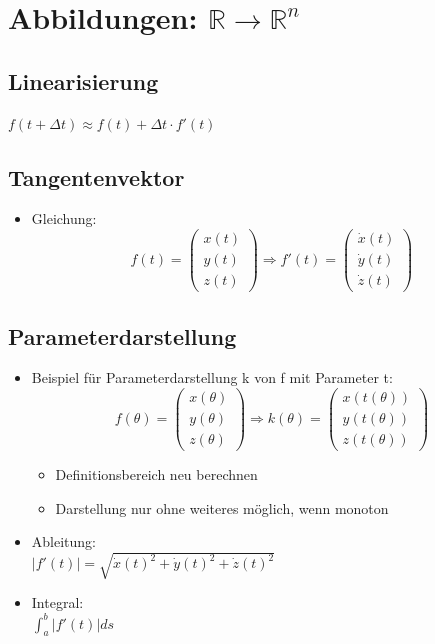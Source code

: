 \section{Abbildungen: $\mathbb{R} \rightarrow \mathbb{R}^n$}

\subsection{Linearisierung}
$f(t+\Delta t) \approx f(t) + \Delta t \cdot f'(t)$

\subsection{Tangentenvektor}
\begin{itemize}
	\item Gleichung: \\
	\begin{displaymath}
		f(t) =
		\begin{pmatrix}
			x(t) \\ y(t) \\ z(t)
		\end{pmatrix}
		\Rightarrow
		f'(t) =
		\begin{pmatrix}
			\dot{x}(t) \\ \dot{y}(t) \\ \dot{z}(t)
		\end{pmatrix}
	\end{displaymath}
\end{itemize}

\subsection{Parameterdarstellung}
\begin{itemize}
	\item Beispiel für Parameterdarstellung k von f mit Parameter t:
	\begin{displaymath}
		f(\theta) =
		\begin{pmatrix}
			x(\theta) \\ y(\theta) \\ z(\theta)
		\end{pmatrix}
		\Rightarrow
		k(\theta) =
		\begin{pmatrix}
			x(t(\theta)) \\ y(t(\theta)) \\ z(t(\theta))
		\end{pmatrix}
	\end{displaymath}
	\begin{itemize}
		\item Definitionsbereich neu berechnen
		\item Darstellung nur ohne weiteres möglich, wenn monoton
	\end{itemize}
	\item Ableitung: \\
	$|f'(t)| = \sqrt{\dot{x}(t)^2 + \dot{y}(t)^2 + \dot{z}(t)^2}$
	\item Integral: \\
	$\int_a^b |f'(t)| ds$
\end{itemize}

